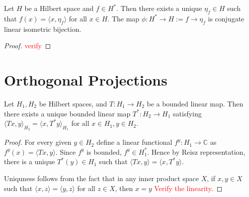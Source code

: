 \begin{theorem}
  Let $H$ be a Hilbert space and $f \in H^*$. Then there exists a
  unique $\eta_f \in H$ such that $f(x) = \langle x , \eta_f \rangle $
  for all $ x \in H$. The map $\phi: H^* \to H := f \to \eta_f$ is
  conjugate linear isometric bijection.
\end{theorem}
\begin{proof}
  \textcolor{red}{verify}
\end{proof}

\section{Orthogonal Projections}

\begin{theorem}
  Let $H_1, H_2$ be Hilbert spaces, and $T: H_1 \to H_2$ be a bounded
  linear map. Then there exists a unique bounded linear map $T^*: H_2
  \to H_1$ satisfying $\langle  Tx , y \rangle_{H_2} = \langle x ,
  T^*y \rangle_{H_1}$ for all $x \in H_1, y \in H_2$.
\end{theorem}
\begin{proof}
  For every given $y \in H_2$ define a linear functional $f^y: H_1
  \to \mathbb{C}$ as $f^y(x) = \langle Tx , y \rangle$. Since $f^{y}$
  is bounded, $f^y \in H_1^*$. Hence by Reisz representation, there
  is a unique $T^*(y) \in H_1$ such that $\langle  Tx , y \rangle =
  \langle x , T^*y \rangle$.

  Uniquness follows from the fact that in any inner product space
  $X$, if $x, y \in X$ such that $ \langle x , z \rangle = \langle  y
  , z \rangle $ for all $z \in X$, then $x = y$
  \textcolor{red}{Verify the linearity}.
\end{proof}

